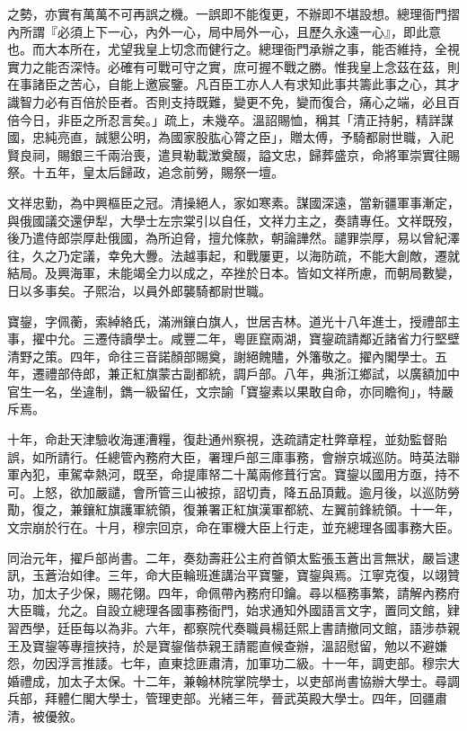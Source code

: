 \begin{pinyinscope}
之勢，亦實有萬萬不可再誤之機。一誤即不能復更，不辦即不堪設想。總理衙門摺內所謂『必須上下一心，內外一心，局中局外一心，且歷久永遠一心』，即此意也。而大本所在，尤望我皇上切念而健行之。總理衙門承辦之事，能否維持，全視實力之能否深恃。必確有可戰可守之實，庶可握不戰之勝。惟我皇上念茲在茲，則在事諸臣之苦心，自能上邀宸鑒。凡百臣工亦人人有求知此事共籌此事之心，其才識智力必有百倍於臣者。否則支持既難，變更不免，變而復合，痛心之端，必且百倍今日，非臣之所忍言矣。」疏上，未幾卒。溫詔賜恤，稱其「清正持躬，精詳謀國，忠純亮直，誠懇公明，為國家股肱心膂之臣」，贈太傅，予騎都尉世職，入祀賢良祠，賜銀三千兩治喪，遣貝勒載澂奠醊，謚文忠，歸葬盛京，命將軍崇實往賜祭。十五年，皇太后歸政，追念前勞，賜祭一壇。

文祥忠勤，為中興樞臣之冠。清操絕人，家如寒素。謀國深遠，當新疆軍事漸定，與俄國議交還伊犁，大學士左宗棠引以自任，文祥力主之，奏請專任。文祥既歿，後乃遣侍郎崇厚赴俄國，為所迫脅，擅允條款，朝論譁然。譴罪崇厚，易以曾紀澤往，久之乃定議，幸免大釁。法越事起，和戰屢更，以海防疏，不能大創敵，遷就結局。及興海軍，未能竭全力以成之，卒挫於日本。皆如文祥所慮，而朝局數變，日以多事矣。子熙治，以員外郎襲騎都尉世職。

寶鋆，字佩蘅，索綽絡氏，滿洲鑲白旗人，世居吉林。道光十八年進士，授禮部主事，擢中允。三遷侍讀學士。咸豐二年，粵匪竄兩湖，寶鋆疏請鄰近諸省力行堅壁清野之策。四年，命往三音諾顏部賜奠，謝絕餽贐，外籓敬之。擢內閣學士。五年，遷禮部侍郎，兼正紅旗蒙古副都統，調戶部。八年，典浙江鄉試，以廣額加中官生一名，坐違制，鐫一級留任，文宗諭「寶鋆素以果敢自命，亦同瞻徇」，特嚴斥焉。

十年，命赴天津驗收海運漕糧，復赴通州察視，迭疏請定杜弊章程，並劾監督貽誤，如所請行。任總管內務府大臣，署理戶部三庫事務，會辦京城巡防。時英法聯軍內犯，車駕幸熱河，既至，命提庫帑二十萬兩修葺行宮。寶鋆以國用方亟，持不可。上怒，欲加嚴譴，會所管三山被掠，詔切責，降五品頂戴。逾月後，以巡防勞勩，復之，兼鑲紅旗護軍統領，復兼署正紅旗漢軍都統、左翼前鋒統領。十一年，文宗崩於行在。十月，穆宗回京，命在軍機大臣上行走，並充總理各國事務大臣。

同治元年，擢戶部尚書。二年，奏劾壽莊公主府首領太監張玉蒼出言無狀，嚴旨逮訊，玉蒼治如律。三年，命大臣輪班進講治平寶鑒，寶鋆與焉。江寧克復，以翊贊功，加太子少保，賜花翎。四年，命佩帶內務府印鑰。尋以樞務事繁，請解內務府大臣職，允之。自設立總理各國事務衙門，始求通知外國語言文字，置同文館，肄習西學，廷臣每以為非。六年，都察院代奏職員楊廷熙上書請撤同文館，語涉恭親王及寶鋆等專擅挾持，於是寶鋆偕恭親王請罷直候查辦，溫詔慰留，勉以不避嫌怨，勿因浮言推諉。七年，直東捻匪肅清，加軍功二級。十一年，調吏部。穆宗大婚禮成，加太子太保。十二年，兼翰林院掌院學士，以吏部尚書協辦大學士。尋調兵部，拜體仁閣大學士，管理吏部。光緒三年，晉武英殿大學士。四年，回疆肅清，被優敘。


\end{pinyinscope}
